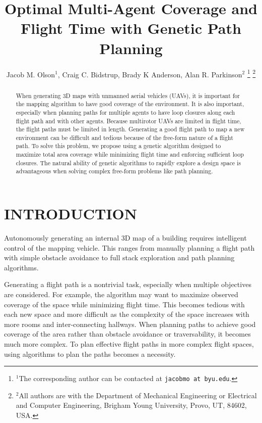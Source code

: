 \documentclass[letterpaper, 10 pt, conference]{ieeeconf}  %
\title{\LARGE \bf
Optimal Multi-Agent Coverage and Flight Time with Genetic Path Planning
}
\author{Jacob M. Olson$^{1}$, Craig C. Bidstrup, Brady K Anderson, Alan R. Parkinson$^{2}$%
\thanks{$^{1}$The corresponding author can be contacted at
        {\tt\small jacobmo at byu.edu}.}%
\thanks{$^{2}$All authors are with the Department of Mechanical Engineering or Electrical and Computer Engineering,
        Brigham Young University, Provo, UT, 84602, USA.}%
}
\begin{document}
\maketitle
\thispagestyle{empty}
\pagestyle{empty}


\begin{abstract}

When generating 3D maps with unmanned aerial vehicles (UAVs), it is important for the mapping algorithm to have good coverage of the environment. It is also important, especially when planning paths for multiple agents to have loop closures along each flight path and with other agents. Because multirotor UAVs are limited in flight time, the flight paths must be limited in length. Generating a good flight path to map a new environment can be difficult and tedious because of the free-form nature of a flight path. To solve this problem, we propose using a genetic algorithm designed to maximize total area coverage while minimizing flight time and enforcing sufficient loop closures. The natural ability of genetic algorithms to rapidly explore a design space is advantageous when solving complex free-form problems like path planning.

\end{abstract}


\section{INTRODUCTION}


Autonomously generating an internal 3D map of a building requires intelligent control of the mapping vehicle. This ranges from manually planning a flight path with simple obstacle avoidance to full stack exploration and path planning algorithms.

Generating a flight path is a nontrivial task, especially when multiple objectives are considered. For example, the algorithm may want to maximize observed coverage of the space while minimizing flight time. This becomes tedious with each new space and more difficult as the complexity of the space increases with more rooms and inter-connecting hallways. When planning paths to achieve good coverage of the area rather than obstacle avoidance or traversability, it becomes much more complex. To plan effective flight paths in more complex flight spaces, using algorithms to plan the paths becomes a necessity.
\end{document}
